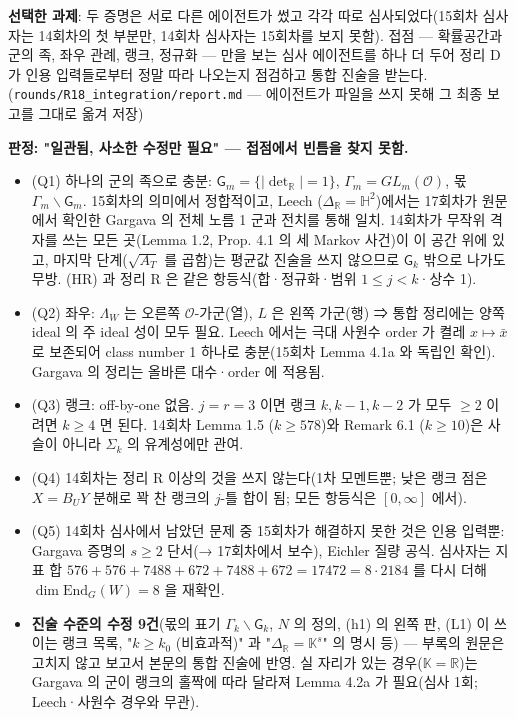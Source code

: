 \textbf{선택한 과제}: 두 증명은 서로 다른 에이전트가 썼고 각각 따로 심사되었다(15회차 심사자는 14회차의 첫 부분만, 14회차 심사자는 15회차를 보지 못함). 접점 --- 확률공간과 군의 족, 좌우 관례, 랭크, 정규화 --- 만을 보는 심사 에이전트를 하나 더 두어 정리 D 가 인용 입력들로부터 정말 따라 나오는지 점검하고 통합 진술을 받는다. (\texttt{rounds/R18\_integration/report.md} --- 에이전트가 파일을 쓰지 못해 그 최종 보고를 그대로 옮겨 저장)

\textbf{판정: "일관됨, 사소한 수정만 필요" --- 접점에서 빈틈을 찾지 못함.}

\begin{itemize}
\tightlist
\item
  (Q1) 하나의 군의 족으로 충분: \(\mathsf G_m=\{|\det_\mathbb R|=1\}\), \(\Gamma_m=GL_m(\mathcal O)\), 몫 \(\Gamma_m\backslash\mathsf G_m\). 15회차의 의미에서 정합적이고, Leech (\(\Delta_\mathbb R=\mathbb H^2\))에서는 17회차가 원문에서 확인한 Gargava 의 전체 노름 1 군과 전치를 통해 일치. 14회차가 무작위 격자를 쓰는 모든 곳(Lemma 1.2, Prop. 4.1 의 세 Markov 사건)이 이 공간 위에 있고, 마지막 단계(\(\sqrt{A_T}\) 를 곱함)는 평균값 진술을 쓰지 않으므로 \(\mathsf G_k\) 밖으로 나가도 무방. (HR) 과 정리 R 은 같은 항등식(합·정규화·범위 \(1\le j<k\)·상수 1).
\item
  (Q2) 좌우: \(\Lambda_W\) 는 오른쪽 \(\mathcal O\)-가군(열), \(L\) 은 왼쪽 가군(행) ⇒ 통합 정리에는 양쪽 ideal 의 주 ideal 성이 모두 필요. Leech 에서는 극대 사원수 order 가 켤레 \(x\mapsto\bar x\) 로 보존되어 class number 1 하나로 충분(15회차 Lemma 4.1a 와 독립인 확인). Gargava 의 정리는 올바른 대수·order 에 적용됨.
\item
  (Q3) 랭크: off-by-one 없음. \(j=r=3\) 이면 랭크 \(k,k-1,k-2\) 가 모두 \(\ge2\) 이려면 \(k\ge4\) 면 된다. 14회차 Lemma 1.5 (\(k\ge578\))와 Remark 6.1 (\(k\ge10\))은 사슬이 아니라 \(\Sigma_k\) 의 유계성에만 관여.
\item
  (Q4) 14회차는 정리 R 이상의 것을 쓰지 않는다(1차 모멘트뿐; 낮은 랭크 점은 \(X=B_UY\) 분해로 꽉 찬 랭크의 \(j\)-틀 합이 됨; 모든 항등식은 \([0,\infty]\) 에서).
\item
  (Q5) 14회차 심사에서 남았던 문제 중 15회차가 해결하지 못한 것은 인용 입력뿐: Gargava 증명의 \(s\ge2\) 단서(→ 17회차에서 보수), Eichler 질량 공식. 심사자는 지표 합 \(576+576+7488+672+7488+672=17472=8\cdot2184\) 를 다시 더해 \(\dim\mathrm{End}_G(W)=8\) 을 재확인.
\item
  \textbf{진술 수준의 수정 9건}(몫의 표기 \(\Gamma_k\backslash\mathsf G_k\), \(N\) 의 정의, (h1) 의 왼쪽 판, (L1) 이 쓰이는 랭크 목록, "\(k\ge k_0\) (비효과적)" 과 "\(\Delta_\mathbb R=\mathbb K^s\)" 의 명시 등) --- 부록의 원문은 고치지 않고 보고서 본문의 통합 진술에 반영. 실 자리가 있는 경우(\(\mathbb K=\mathbb R\))는 Gargava 의 군이 랭크의 홀짝에 따라 달라져 Lemma 4.2a 가 필요(심사 1회; Leech·사원수 경우와 무관).
\end{itemize}

